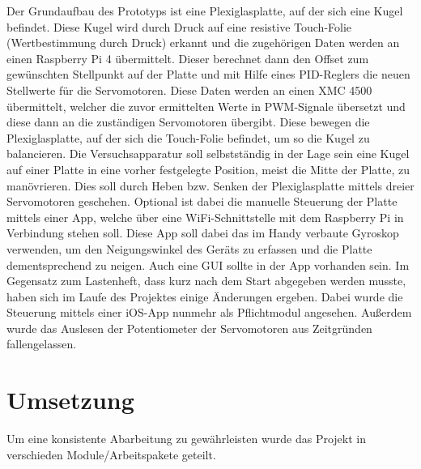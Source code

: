 \documentclass[12pt,a4paper,bibliography=totoc,listof=totoc]{scrartcl}
\begin{document}
Der Grundaufbau des Prototyps ist eine Plexiglasplatte, auf der sich 
eine Kugel befindet. Diese Kugel wird durch Druck auf eine resistive Touch-Folie (Wertbestimmung durch 
Druck) erkannt und die zugehörigen Daten werden an einen Raspberry Pi 4 übermittelt. Dieser berechnet dann 
den Offset zum gewünschten Stellpunkt auf der Platte und mit Hilfe eines PID-Reglers die neuen Stellwerte 
für die Servomotoren. Diese Daten werden an einen XMC 4500 übermittelt, welcher die zuvor ermittelten Werte 
in PWM-Signale übersetzt und diese dann an die zuständigen Servomotoren übergibt. Diese bewegen die 
Plexiglasplatte, auf der sich die Touch-Folie befindet, um so die Kugel zu balancieren.
Die Versuchsapparatur soll selbstständig in der Lage sein eine Kugel auf einer Platte in eine vorher 
festgelegte Position, meist die Mitte der Platte, zu manövrieren. Dies soll durch Heben bzw. Senken der 
Plexiglasplatte mittels dreier Servomotoren geschehen. Optional ist dabei die manuelle Steuerung der 
Platte mittels einer App, welche über eine WiFi-Schnittstelle mit dem Raspberry Pi in Verbindung stehen 
soll. Diese App soll dabei das im Handy verbaute Gyroskop verwenden, um den Neigungswinkel des Geräts zu 
erfassen und die Platte dementsprechend zu neigen. Auch eine GUI sollte in der App vorhanden sein.
\newline Im Gegensatz zum Lastenheft, dass kurz nach dem Start abgegeben werden musste, haben sich im 
Laufe des Projektes einige Änderungen ergeben. Dabei wurde die Steuerung mittels einer iOS-App nunmehr 
als Pflichtmodul angesehen. Außerdem wurde das Auslesen der Potentiometer der Servomotoren aus Zeitgründen 
fallengelassen.
\pagebreak
\section {Umsetzung}
Um eine konsistente Abarbeitung zu gewährleisten wurde das Projekt in verschieden Module/Arbeitspakete 
geteilt.
\end{document}
